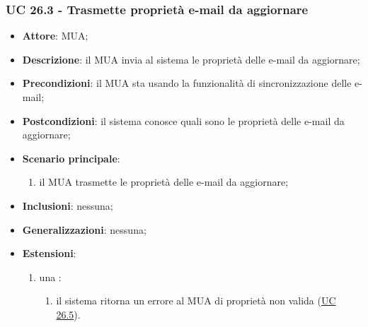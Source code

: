     \subsubsection{UC 26.3 - Trasmette proprietà e-mail da aggiornare} \label{sec:UC26.3}
    \begin{itemize}
        \item \textbf{Attore}: MUA;
        \item \textbf{Descrizione}: il MUA invia al sistema le proprietà delle e-mail da aggiornare;
        \item \textbf{Precondizioni}: il MUA sta usando la funzionalità di sincronizzazione delle e-mail;
        \item \textbf{Postcondizioni}: il sistema conosce quali sono le proprietà delle e-mail da aggiornare;
        \item \textbf{Scenario principale}:
            \begin{enumerate}
                \item il MUA trasmette le proprietà delle e-mail da aggiornare;
            \end{enumerate}
        \item \textbf{Inclusioni}: nessuna;
        \item \textbf{Generalizzazioni}: nessuna;
        \item \textbf{Estensioni}:
            \begin{enumerate}[label=\alph*.]
                \item una :
                \begin{enumerate}[label=\arabic*.]
                    \item il sistema ritorna un errore al MUA di proprietà non valida (\hyperref[sec:UC26.5]{UC 26.5}).
                \end{enumerate}
            \end{enumerate}
    \end{itemize}


